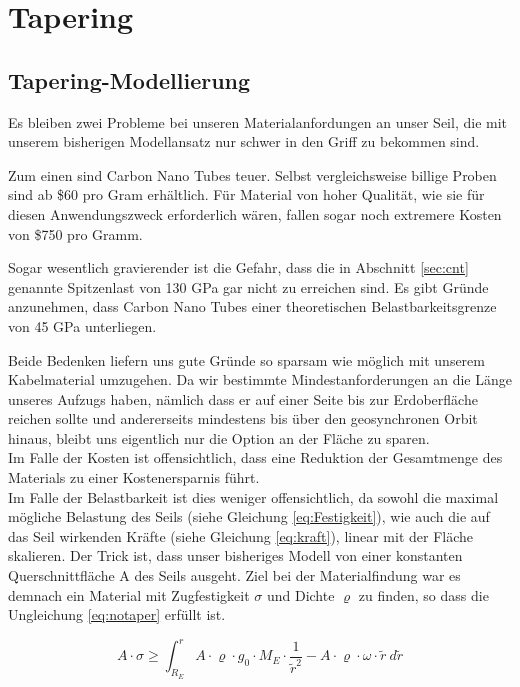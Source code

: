 \documentclass[a4paper, 10pt]{report}
\begin{document}
\section{Tapering}
\subsection{Tapering-Modellierung}
Es bleiben zwei Probleme bei unseren Materialanfordungen an unser Seil, die mit unserem bisherigen Modellansatz nur schwer in den Griff zu bekommen sind.

Zum einen sind Carbon Nano Tubes teuer. Selbst vergleichsweise billige Proben sind ab \$60 pro Gram erhältlich. Für Material von hoher Qualität, wie sie für diesen Anwendungszweck erforderlich wären, fallen sogar noch extremere Kosten von \$750 pro Gramm\cite{baughman2002carbon}.

Sogar wesentlich gravierender ist die Gefahr, dass die in Abschnitt \ref{sec:cnt} genannte Spitzenlast von 130 GPa gar nicht zu erreichen sind. Es gibt Gründe anzunehmen, dass Carbon Nano Tubes einer theoretischen Belastbarkeitsgrenze von 45 GPa unterliegen\cite{pugno2007space}.

Beide Bedenken liefern uns gute Gründe so sparsam wie möglich mit unserem Kabelmaterial umzugehen. Da wir bestimmte Mindestanforderungen an die Länge unseres Aufzugs haben, nämlich dass er auf einer Seite bis zur Erdoberfläche reichen sollte und andererseits mindestens bis über den geosynchronen Orbit hinaus, bleibt uns eigentlich nur die Option an der Fläche zu sparen.\\
Im Falle der Kosten ist offensichtlich, dass eine Reduktion der Gesamtmenge des Materials zu einer Kostenersparnis führt.\\
Im Falle der Belastbarkeit ist dies weniger offensichtlich, da sowohl die maximal mögliche Belastung des Seils (siehe Gleichung \ref{eq:Festigkeit}), wie auch die auf das Seil wirkenden Kräfte (siehe Gleichung \ref{eq:kraft}), linear mit der Fläche skalieren. Der Trick ist, dass unser bisheriges Modell von einer konstanten Querschnittfläche A des Seils ausgeht. Ziel bei der Materialfindung war es demnach ein Material mit Zugfestigkeit $\sigma$ und Dichte $\varrho$ zu finden, so dass die Ungleichung \ref{eq:notaper} erfüllt ist.

\begin{equation}
A \cdot \sigma \geq \int_{R_E}^{r} A \cdot \varrho \cdot g_0 \cdot M_E \cdot \frac{1}{\tilde{r}^2} - A \cdot \varrho \cdot \omega \cdot \tilde{r}\ d\tilde{r}
\label{eq:notaper}
\end{equation}
\end{document}
